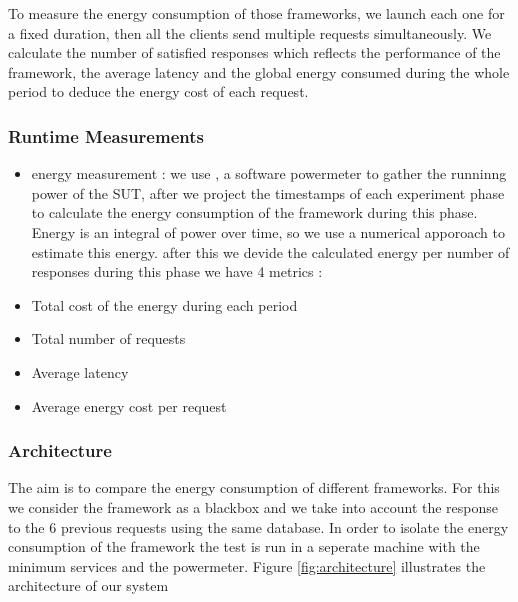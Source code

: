 To measure the energy consumption of those frameworks, we launch each one for a fixed duration, then all the clients send multiple requests simultaneously.
We calculate %
the number of satisfied responses which reflects the performance of the framework, the average latency and the global energy consumed during the whole period to deduce the energy cost of each request.

\subsubsection{Runtime Measurements}
\begin{itemize}
    \item energy measurement :
          we use , a software powermeter  to gather the runninng power of the SUT, after we project the timestamps of each experiment phase to calculate the energy consumption of the framework during this phase.
          Energy is an integral of power over time, so we use a numerical apporoach to estimate this energy. 
          after this we devide the calculated energy per number of responses
          during this phase
          we have 4 metrics :

    \item Total cost of the energy during each period
    \item Total number of requests
    \item Average latency
    \item Average energy cost per request
\end{itemize}

\subsubsection{Architecture}
The aim is to compare the energy consumption of different frameworks. For this we consider the framework as a blackbox and we take into account the response to the 6 previous requests using the same database.
In order to isolate the energy consumption of the framework the test is run in a seperate machine with the minimum services and the powermeter.
Figure \ref{fig:architecture} illustrates the architecture of our system

